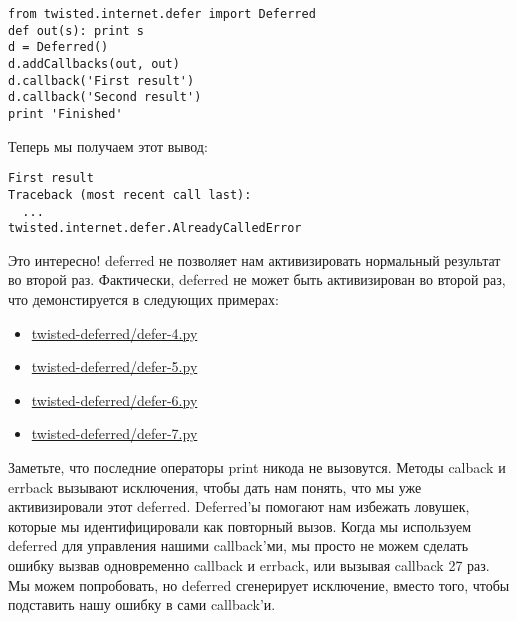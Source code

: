  \begin{verbatim}
from twisted.internet.defer import Deferred
def out(s): print s
d = Deferred()
d.addCallbacks(out, out)
d.callback('First result')
d.callback('Second result')
print 'Finished'
\end{verbatim} 

Теперь мы получаем этот вывод:

 \begin{verbatim}
First result
Traceback (most recent call last):
  ...
twisted.internet.defer.AlreadyCalledError
\end{verbatim} 


Это интересно! deferred не позволяет нам 
активизировать нормальный результат во второй раз. 
Фактически, deferred не может быть активизирован во второй 
раз, что демонстируется в следующих примерах: 

\begin{itemize}
\item \href{http://github.com/jdavisp3/twisted-intro/blob/master/twisted-deferred/defer-4.py}{twisted-deferred/defer-4.py}
\item \href{http://github.com/jdavisp3/twisted-intro/blob/master/twisted-deferred/defer-5.py}{twisted-deferred/defer-5.py}
\item \href{http://github.com/jdavisp3/twisted-intro/blob/master/twisted-deferred/defer-6.py}{twisted-deferred/defer-6.py}
\item \href{http://github.com/jdavisp3/twisted-intro/blob/master/twisted-deferred/defer-7.py}{twisted-deferred/defer-7.py}
\end{itemize}


Заметьте, что последние операторы print никода не вызовутся. 
Методы calback и errback вызывают исключения, 
чтобы дать нам понять, что мы уже активизировали этот deferred. 
Deferred'ы помогают нам избежать ловушек, которые мы идентифицировали 
как повторный вызов. Когда мы используем 
deferred для управления нашими callback'ми, мы просто не можем 
сделать ошибку вызвав одновременно callback и errback, или вызывая callback 
27 раз. Мы можем попробовать, но deferred сгенерирует исключение, 
вместо того, чтобы подставить нашу ошибку в сами callback'и. 



